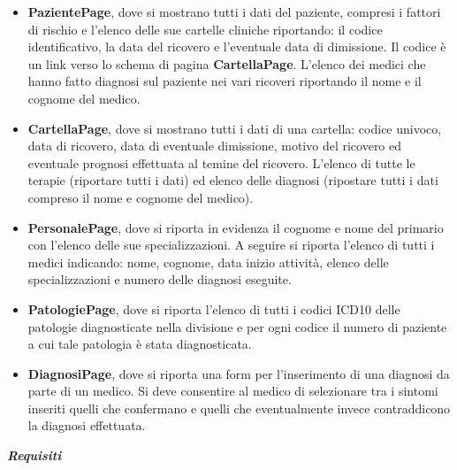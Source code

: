 \documentclass[a4paper,titlepage]{article}
\begin{document}
\begin{itemize}[leftmargin=0.75cm, labelsep= 0.5cm]
\begin{itemize}[leftmargin=1.5cm, labelsep= 0.5cm, label=$\circ$]
	\end{itemize}
\item \textbf{PazientePage}, dove si mostrano tutti i dati del paziente, compresi i fattori di rischio e l'elenco delle sue cartelle cliniche riportando: il codice identificativo, la data del ricovero e l'eventuale data di dimissione. Il codice è un link verso lo schema di pagina \textbf{CartellaPage}. L'elenco dei medici che hanno fatto diagnosi sul paziente nei vari ricoveri riportando il nome e il cognome del medico.
\item \textbf{CartellaPage}, dove si mostrano tutti i dati di una cartella: codice univoco, data di ricovero, data di eventuale dimissione, motivo del ricovero ed eventuale prognosi effettuata al temine del ricovero. L'elenco di tutte le terapie (riportare tutti i dati) ed elenco delle diagnosi (ripostare tutti i dati compreso il nome e cognome del medico).
\item \textbf{PersonalePage}, dove si riporta in evidenza il cognome e nome del primario con l'elenco delle sue specializzazioni. A seguire si riporta l'elenco di tutti i medici indicando: nome, cognome, data inizio attività, elenco delle specializzazioni e numero delle diagnosi eseguite.
\item \textbf{PatologiePage}, dove si riporta l'elenco di tutti i codici ICD10 delle patologie diagnosticate nella divisione e per ogni codice il numero di paziente a cui tale patologia è stata diagnosticata.
\item \textbf{DiagnosiPage}, dove si riporta una form per l'inserimento di una diagnosi da parte di un medico. Si deve consentire al medico di selezionare tra i sintomi inseriti quelli che confermano e quelli che eventualmente invece contraddicono la diagnosi effettuata.\\
\end{itemize}\par

\noindent
\emph{\textbf{\Large{Requisiti}}}\par
\end{document}
